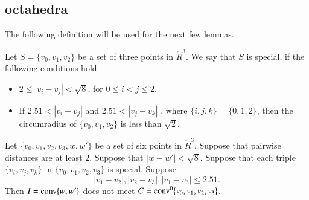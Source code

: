 \newpage






\newpage

\subsection{octahedra}

The following definition will be used for the next few lemmas.

\begin{definition}[special] 
Let $S=\{v_0,v_1,v_2\}$ be a set of three
points in $\ring{R}^3$.  We say that $S$ is special, if
the following conditions hold.  
\begin{itemize}
  \item $2\le |v_i-v_j|<\sqrt8$, for
$0\le i< j \le 2$.  
   \item If $2.51 < |v_i-v_j|$ and $2.51 < |v_j-v_k|$ ,
   where $\{i,j,k\} = \{0,1,2\}$, then
  the circumradius of $\{v_0,v_1,v_2\}$ is less than $\sqrt2$.
  \end{itemize}
\end{definition}

\newpage

\begin{lemma}
Let $\{v_0,v_1,v_2,v_3,w,w'\}$ be a set of six points in $\ring{R}^3$.
Suppose that pairwise distances are at least $2$.  Suppose that
$|w-w'| < \sqrt8$.  Suppose that each triple $\{v_i,v_j,v_k\}$
in $\{v_0,v_1,v_2,v_3\}$ is special. 
Suppose   %
   $$
   |v_1-v_2|,|v_2-v_3|,|v_1-v_3|\le 2.51.
   $$
Then $I={\operatorname{conv}}\{w,w'\}$ does not meet $C={\operatorname{conv}}^0\{v_0,v_1,v_2,v_3\}$.
\end{lemma}


